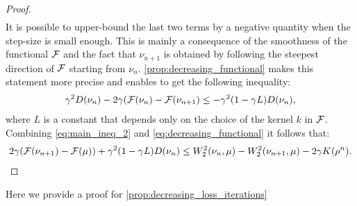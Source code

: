 \begin{proof}
\begin{align}
	\label{eq:main_ineq_2}
	\end{align}
	It is possible to upper-bound the last two terms by a negative quantity when the step-size is small enough. This is mainly a consequence of the smoothness of the functional ${{\mathcal F}}$ and the fact that $\nu_{n+1}$ is obtained by following the steepest direction of ${{\mathcal F}}$ starting from $\nu_n$. \cref{prop:decreasing_functional} makes this statement more precise and enables to get the following inequality:
	\begin{align}
	\gamma^2 D(\nu_n) -2\gamma ({{\mathcal F}}(\nu_n)-{{\mathcal F}}(\nu_{n+1})\leq -\gamma^2 (1-\gamma L)D(\nu_n),
	\label{eq:decreasing_functional}
	\end{align}
	where $L$ is a constant that depends only on the choice of the kernel $k$ in ${{\mathcal F}}$. Combining  \cref{eq:main_ineq_2} and \cref{eq:decreasing_functional} it follows that:
	\begin{align}
	2\gamma({{\mathcal F}}(\nu_{n+1})-{{\mathcal F}}(\mu))+\gamma^2(1-\gamma L)D(\nu_n)
	\leq 
	W_2^2(\nu_n,\mu)-W_2^2(\nu_{n+1},\mu)-2\gamma K(\rho^n).
	\label{eq:main_final}
	\end{align}
\end{proof}


Here we provide a proof for \cref{prop:decreasing_loss_iterations}


